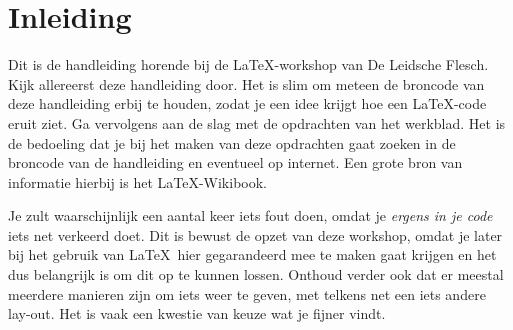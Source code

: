 


\maketitle
\tableofcontents
\newpage

\section{Inleiding}

Dit is de handleiding horende bij de \LaTeX-workshop van De Leidsche Flesch.
Kijk allereerst deze handleiding door. Het is slim om meteen de broncode van
deze handleiding erbij te houden, zodat je een idee krijgt hoe een \LaTeX-code
eruit ziet. Ga vervolgens aan de slag met de opdrachten van het werkblad. Het is
de bedoeling dat je bij het maken van deze opdrachten gaat zoeken in de broncode
van de handleiding en eventueel op internet. Een grote bron van informatie
hierbij is het \LaTeX-Wikibook\cite{wikibook}.


Je zult waarschijnlijk een aantal keer iets fout doen, omdat je \emph{ergens in
je code} iets net verkeerd doet. Dit is bewust de opzet van deze workshop, omdat
je later bij het gebruik van \LaTeX\ hier gegarandeerd mee te maken gaat krijgen
en het dus belangrijk is om dit op te kunnen lossen. Onthoud verder ook dat er
meestal meerdere manieren zijn om iets weer te geven, met telkens net een iets
andere lay-out. Het is vaak een kwestie van keuze wat je fijner vindt.

